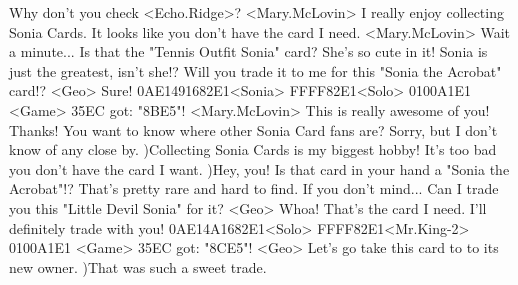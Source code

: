Why don't you check <Echo.Ridge>? 
<Mary.McLovin> I really enjoy collecting Sonia Cards. 
It looks like you don't have the card I need. 
<Mary.McLovin> Wait a minute... 
Is that the "Tennis Outfit Sonia" card? 
She's so cute in it! Sonia is just the greatest, isn't she!? 
Will you trade it to me for this "Sonia the Acrobat" card!? 
<Geo> Sure! 
{0A}{E1}{49}{16}{82}{E1}<Sonia> {FF}{FF}{82}{E1}<Solo> {01}{00}{A1}{E1} 
<Game> {35}{EC} got: "{8B}{E5}"! 
<Mary.McLovin> This is really awesome of you! Thanks! 
You want to know where other Sonia Card fans are? 
Sorry, but I don't know of any close by. 
)Collecting Sonia Cards is my biggest hobby! 
It's too bad you don't have the card I want. 
)Hey, you! 
Is that card in your hand a "Sonia the Acrobat"!? 
That's pretty rare and hard to find. 
If you don't mind... 
Can I trade you this "Little Devil Sonia" for it? 
<Geo> Whoa! That's the card I need. 
I'll definitely trade with you! 
{0A}{E1}{4A}{16}{82}{E1}<Solo> {FF}{FF}{82}{E1}<Mr.King-2> {01}{00}{A1}{E1} 
<Game> {35}{EC} got: "{8C}{E5}"! 
<Geo> Let's go take this card to to its new owner. 
)That was such a sweet trade. 

